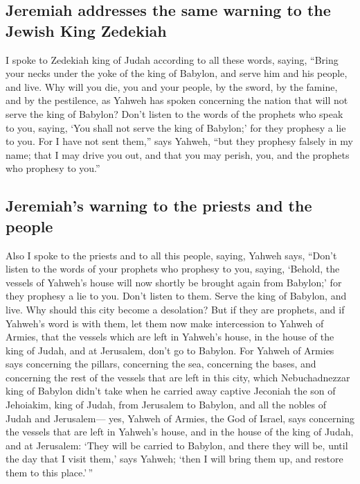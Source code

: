 \hypertarget{jeremiah-addresses-the-same-warning-to-the-jewish-king-zedekiah}{%
\subsection{Jeremiah addresses the same warning to the Jewish King
Zedekiah}\label{jeremiah-addresses-the-same-warning-to-the-jewish-king-zedekiah}}

 I spoke to Zedekiah king of Judah according to all these
words, saying, ``Bring your necks under the yoke of the king of Babylon,
and serve him and his people, and live.  Why will you
die, you and your people, by the sword, by the famine, and by the
pestilence, as Yahweh has spoken concerning the nation that will not
serve the king of Babylon?  Don't listen to the words of
the prophets who speak to you, saying, `You shall not serve the king of
Babylon;' for they prophesy a lie to you.  For I have not
sent them,'' says Yahweh, ``but they prophesy falsely in my name; that I
may drive you out, and that you may perish, you, and the prophets who
prophesy to you.''

\hypertarget{jeremiahs-warning-to-the-priests-and-the-people}{%
\subsection{Jeremiah's warning to the priests and the
people}\label{jeremiahs-warning-to-the-priests-and-the-people}}

 Also I spoke to the priests and to all this people,
saying, Yahweh says, ``Don't listen to the words of your prophets who
prophesy to you, saying, `Behold, the vessels of Yahweh's house will now
shortly be brought again from Babylon;' for they prophesy a lie to you.
 Don't listen to them. Serve the king of Babylon, and
live. Why should this city become a desolation?  But if
they are prophets, and if Yahweh's word is with them, let them now make
intercession to Yahweh of Armies, that the vessels which are left in
Yahweh's house, in the house of the king of Judah, and at Jerusalem,
don't go to Babylon.  For Yahweh of Armies says
concerning the pillars, concerning the sea, concerning the bases, and
concerning the rest of the vessels that are left in this city,
 which Nebuchadnezzar king of Babylon didn't take when he
carried away captive Jeconiah the son of Jehoiakim, king of Judah, from
Jerusalem to Babylon, and all the nobles of Judah and Jerusalem---
 yes, Yahweh of Armies, the God of Israel, says
concerning the vessels that are left in Yahweh's house, and in the house
of the king of Judah, and at Jerusalem:  `They will be
carried to Babylon, and there they will be, until the day that I visit
them,' says Yahweh; `then I will bring them up, and restore them to this
place.'\,''

